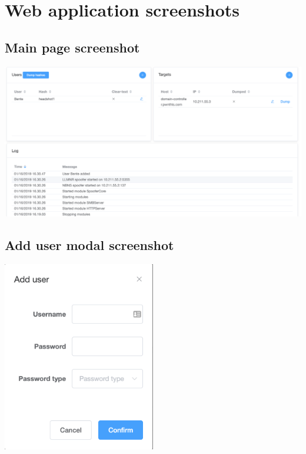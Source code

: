 \documentclass{article}
\begin{document}
\section{Web application screenshots}
\subsection{Main page screenshot}
\label{appendix:web-ui}
\includegraphics[width=\textwidth]{figures/web-ui.png}

\subsection{Add user modal screenshot}
\label{appendix:add-user-modal}
\begin{center}
    \includegraphics[width=0.5\textwidth]{figures/add-user-modal.png}
\end{center}
\end{document}
